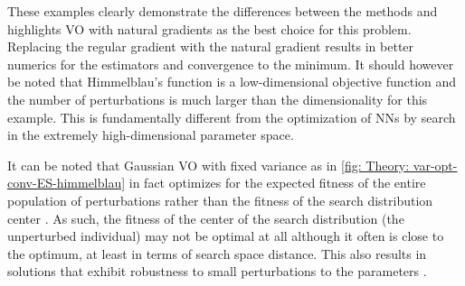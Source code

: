 These examples clearly demonstrate the differences between the methods and highlights \gls{VO} with natural gradients as the best choice for this problem. Replacing the regular gradient with the natural gradient results in better numerics for the estimators and convergence to the minimum. It should however be noted that Himmelblau's function is a low-dimensional objective function and the number of perturbations is much larger than the dimensionality for this example. This is fundamentally different from the optimization of \glspl{NN} by search in the extremely high-dimensional parameter space.

It can be noted that Gaussian \gls{VO} with fixed variance as in \autoref{fig: Theory: var-opt-conv-ES-himmelblau} in fact optimizes for the expected fitness of the entire population of perturbations rather than the fitness of the search distribution center \cite{Lehman2017}. As such, the fitness of the center of the search distribution (the unperturbed individual) may not be optimal at all although it often is close to the optimum, at least in terms of search space distance. This also results in solutions that exhibit robustness to small perturbations to the parameters \cite{Lehman2017}.
